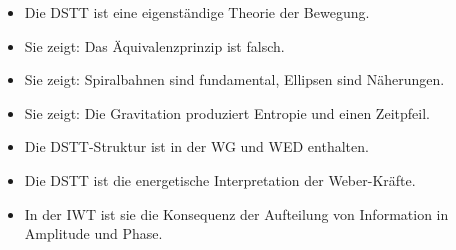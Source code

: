 \begin{itemize}
\item Die DSTT ist eine eigenständige Theorie der Bewegung.
\item Sie zeigt: Das Äquivalenzprinzip ist falsch.
\item Sie zeigt: Spiralbahnen sind fundamental, Ellipsen sind Näherungen.
\item Sie zeigt: Die Gravitation produziert Entropie und einen Zeitpfeil.
\item Die DSTT-Struktur ist in der WG und WED enthalten.
\item Die DSTT ist die energetische Interpretation der Weber-Kräfte.
\item In der IWT ist sie die Konsequenz der Aufteilung von Information in Amplitude und Phase.
\end{itemize}
